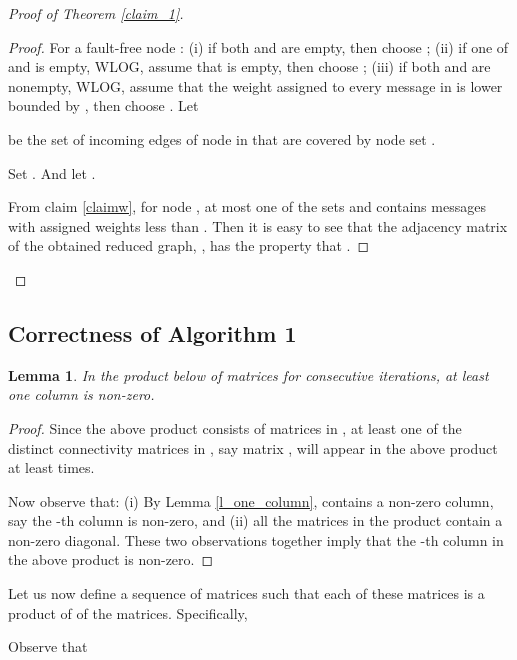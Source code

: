 \documentclass[letterpaper, 11pt]{article}
\newtheorem{lemma}[theorem]{Lemma}
\begin{document}
\begin{proof}[Proof of Theorem \ref{claim_1}]
\begin{proof}
For a fault-free node : (i) if both  and  are empty, then choose ; (ii) if one of  and  is empty, WLOG, assume that  is empty, then choose ; (iii) if both  and  are nonempty, WLOG, assume that the weight assigned to every message in  is lower bounded by , then choose . Let

 be the set of incoming edges of node  in  that are covered by node set .

Set . And let .

From claim \ref{claimw}, for node , at most one of the sets  and  contains messages with assigned weights less than . Then it is easy to see that the adjacency matrix of the obtained reduced graph, , has the property that .





\end{proof}

\end{proof}







\subsection{Correctness of Algorithm 1}\label{app:correctness}

\begin{lemma}
\label{l_product_H}
In the product below of  matrices for consecutive
 iterations, at least one column is non-zero.

\end{lemma}
\begin{proof}
Since the above product consists of  matrices
in ,
at least one of the  distinct connectivity matrices
in , say matrix , will appear in the above
product at least  times.

Now observe that: (i)
By Lemma \ref{l_one_column},  contains a non-zero
column, say the -th column is non-zero,
and (ii) all the  matrices in the product contain a non-zero diagonal.
These two observations together imply that the -th column in the above product
is non-zero.
\end{proof}


Let us now define a sequence of matrices  such that
each of these matrices is a product of  of the
 matrices. Specifically,

Observe that
\end{document}
